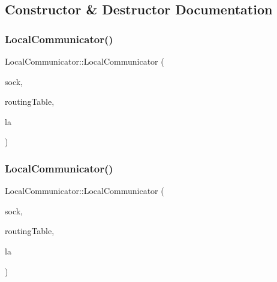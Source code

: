 \subsection{Constructor \& Destructor Documentation}
\mbox{\label{classLocalCommunicator_a477260797392154cc43815852ced969c}} 
\subsubsection{\texorpdfstring{Local\+Communicator()}{LocalCommunicator()}\hspace{0.1cm}{\footnotesize\ttfamily [1/3]}}
{\footnotesize\ttfamily Local\+Communicator\+::\+Local\+Communicator (\begin{DoxyParamCaption}\item[{\hyperlink{structcubiumServerSocket__t}{cubium\+Server\+Socket\+\_\+t} $\ast$}]{sock,  }\item[{std\+::shared\+\_\+ptr$<$ \hyperlink{classRoutingTable}{Routing\+Table}$<$ \hyperlink{structcubiumServerSocket__t}{cubium\+Server\+Socket\+\_\+t} $>$$>$}]{routing\+Table,  }\item[{\hyperlink{structLogicalAddress}{Logical\+Address}}]{la }\end{DoxyParamCaption})\hspace{0.3cm}{\ttfamily [inline]}}

\mbox{\label{classLocalCommunicator_ac5845882ec445ca5f3bedbaf666073c0}} 
\subsubsection{\texorpdfstring{Local\+Communicator()}{LocalCommunicator()}\hspace{0.1cm}{\footnotesize\ttfamily [2/3]}}
{\footnotesize\ttfamily Local\+Communicator\+::\+Local\+Communicator (\begin{DoxyParamCaption}\item[{\hyperlink{structcubiumClientSocket__t}{cubium\+Client\+Socket\+\_\+t} $\ast$}]{sock,  }\item[{std\+::shared\+\_\+ptr$<$ \hyperlink{classRoutingTable}{Routing\+Table}$<$ \hyperlink{structcubiumServerSocket__t}{cubium\+Server\+Socket\+\_\+t} $>$$>$}]{routing\+Table,  }\item[{\hyperlink{structLogicalAddress}{Logical\+Address}}]{la }\end{DoxyParamCaption})\hspace{0.3cm}{\ttfamily [inline]}}

